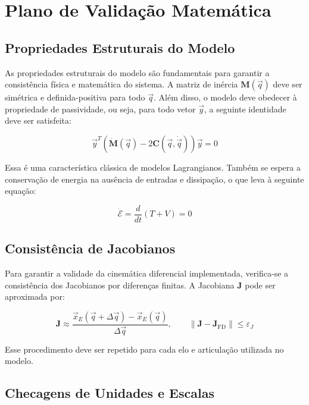 \section{Plano de Validação Matemática}

\subsection{Propriedades Estruturais do Modelo}

As propriedades estruturais do modelo são fundamentais para garantir a consistência física e matemática do sistema. A matriz de inércia $ \mathbf{M}(\vec{q}) $ deve ser simétrica e definida-positiva para todo $ \vec{q} $. Além disso, o modelo deve obedecer à propriedade de passividade, ou seja, para todo vetor $ \vec{y} $, a seguinte identidade deve ser satisfeita:

\begin{equation}
\vec{y}^T \left( \dot{\mathbf{M}}(\vec{q}) - 2\mathbf{C}(\vec{q}, \dot{\vec{q}}) \right) \vec{y} = 0
\label{eq:passividade}
\end{equation}

Essa é uma característica clássica de modelos Lagrangianos. Também se espera a conservação de energia na ausência de entradas e dissipação, o que leva à seguinte equação:

\begin{equation}
\dot{\mathcal{E}} = \frac{d}{dt}(T + V) = 0
\label{eq:conservacao_energia}
\end{equation}

\subsection{Consistência de Jacobianos}

Para garantir a validade da cinemática diferencial implementada, verifica-se a consistência dos Jacobianos por diferenças finitas. A Jacobiana $ \mathbf{J} $ pode ser aproximada por:

\begin{equation}
\mathbf{J} \approx \frac{\vec{x}_E(\vec{q} + \Delta \vec{q}) - \vec{x}_E(\vec{q})}{\Delta \vec{q}}, \qquad \left\| \mathbf{J} - \mathbf{J}_{\mathrm{FD}} \right\| \leq \varepsilon_J
\label{eq:jacobiano_finitas}
\end{equation}

Esse procedimento deve ser repetido para cada elo e articulação utilizada no modelo.

\subsection{Checagens de Unidades e Escalas}


